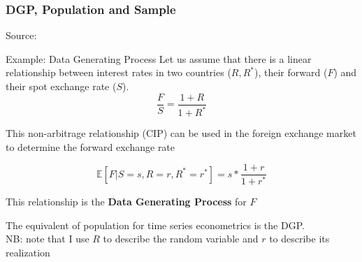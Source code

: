 \documentclass{beamer}
\begin{document}
\begin{frame}
  \frametitle{DGP, Population and Sample}
  \hspace*{15pt}\hbox{\scriptsize Source:}
\end{frame}


\begin{frame}

  \begin{exampleblock}{Example: Data Generating Process}
    Let us assume that there is a linear relationship between interest rates in two countries ($R, R^*$), their forward ($F$) and their spot exchange rate ($S$).\\

    \begin{equation*}
      \frac{F}{S} = \frac{1+R}{1+R^*}
    \end{equation*}

    This non-arbitrage relationship (CIP) can be used in the foreign exchange market to determine the forward exchange rate

    \begin{equation*}
      \mathbb{E}[F |S=s, R=r, R^*= r^*] = s*\frac{1+r}{1+r^*}
    \end{equation*}

This relationship is the \textbf{Data Generating Process} for $F$     
  \end{exampleblock}

The equivalent of population for time series econometrics is the DGP.\\
NB: note that I use $R$ to describe the random variable and $r$ to describe its realization
  
\end{frame}
\end{document}
